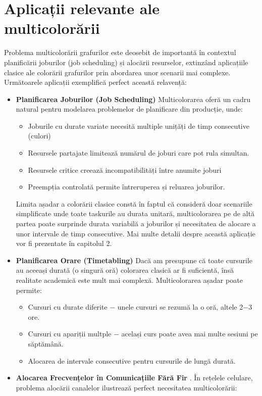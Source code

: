 \section{Aplicații relevante ale multicolorării}
Problema multicolorării grafurilor este deosebit de importantă în contextul planificării joburilor (job scheduling) și alocării resurselor, extinzând aplicațiile clasice ale colorării grafurilor prin abordarea unor scenarii mai complexe. Următoarele aplicații exemplifică perfect această relavență:
\begin{itemize}
  \item {\bf Planificarea Joburilor (Job Scheduling)} Multicolorarea oferă un cadru natural pentru modelarea problemelor de planificare din producție, unde:
   \begin{itemize}
    \item Joburile cu durate variate necesită multiple unițăți de timp consecutive (culori)
    \item Resursele partajate limitează numărul de joburi care pot rula simultan.
    \item Resursele critice creează incompatibilități între anumite joburi
    \item Preempția controlată permite întreruperea și reluarea joburilor.
   \end{itemize}
   Limita așadar a colorării clasice constă în faptul că consideră doar scenariile simplificate unde toate taskurile au durata unitară, multicolorarea pe de altă partea poate surprinde durata variabilă a joburilor și necesitatea de alocare a unor intervale de timp consecutive.
   Mai multe detalii despre această aplicație vor fi prezentate în capitolul 2.
  \item {\bf Planificarea Orare (Timetabling)} Dacă am presupune că toate cursurile au aceeași durată (o singură oră) colorarea clasică ar fi suficientă, însă realitate academică este mult mai complexă. Multicolorarea așadar poate permite:
  \begin{itemize}
    \item Cursuri cu durate diferite $-$ unele cursuri se rezumă la o oră, altele 2$-$3 ore.
    \item Cursuri cu apariții multple $-$ același curs poate avea mai multe sesiuni pe săptămână.
    \item Alocarea de intervale consecutive pentru cursurile de lungă durată. 
  \end{itemize}
  \item {\bf Alocarea Frecvențelor în Comunicațiile Fără Fir }. În rețelele celulare, problema alocării canalelor ilustrează perfect necesitatea multicolorării:

\end{itemize}
